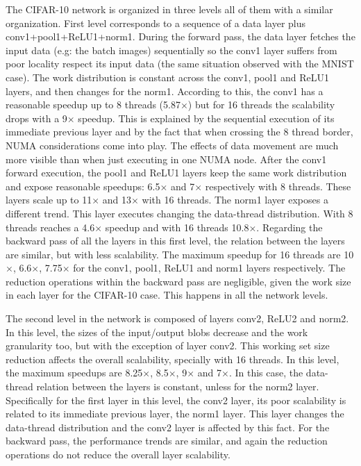 The CIFAR-10 network is organized in three levels all of them with a 
similar organization. First level corresponds to a sequence of a data 
layer plus conv1+pool1+ReLU1+norm1. During the forward pass, the data 
layer fetches the input data (e.g: the batch images) sequentially so 
the conv1 layer suffers from poor locality respect its input data 
(the same situation observed with the MNIST case). The work distribution 
is constant across the conv1, pool1 and ReLU1 layers, and then changes 
for the norm1. According to this, the conv1 has a 
reasonable speedup up to 8 threads (5.87$\times$) but for 16 threads the 
scalability drops with a 9$\times$ speedup. This is explained by the 
sequential execution of its immediate previous layer and by the fact 
that when crossing the 8 thread border, NUMA considerations come into 
play. The effects of data movement are much more visible than when 
just executing in one NUMA node. After the conv1 forward execution, 
the pool1 and ReLU1 layers keep the same work distribution and expose 
reasonable speedups: 6.5$\times$ and 7$\times$ respectively with 8 threads. These 
layers scale up to 11$\times$ and 13$\times$ with 16 threads. The norm1 layer exposes 
a different trend. This layer executes changing the data-thread 
distribution. With 8 threads reaches a 4.6$\times$ speedup and with 
16 threads 10.8$\times$. Regarding the backward pass of all the layers 
in this first level, the relation between the layers are similar, 
but with less scalability. The maximum speedup for 16 threads are 
10$\times$, 6.6$\times$, 7.75$\times$ for the conv1, pool1, ReLU1 and norm1 layers respectively. 
The reduction operations within the backward pass are negligible, 
given the work size in each layer for the CIFAR-10 case. This happens 
in all the network levels.

The second level in the network is composed of layers conv2, ReLU2 
and norm2. In this level, the sizes of the input/output blobs decrease 
and the work granularity too, but with the exception of layer conv2. 
This working set size reduction affects the overall scalability, 
specially with 16 threads. In this level, the maximum speedups are 
8.25$\times$, 8.5$\times$, 9$\times$ and 7$\times$. In this case, the data-thread relation between the 
layers is constant, unless for the norm2 layer. Specifically for the 
first layer in this level, the conv2 layer, its poor scalability is 
related to its immediate previous layer, the norm1 layer. This layer 
changes the data-thread distribution and the conv2 layer is affected 
by this fact. For the backward pass, the performance trends are similar, 
and again the reduction operations do not reduce the overall layer 
scalability.

